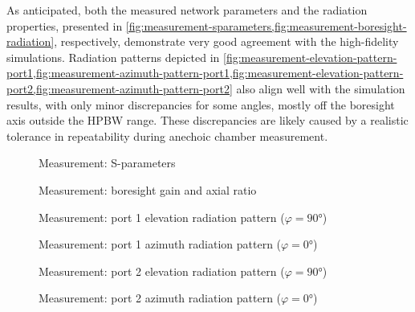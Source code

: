 \documentclass[14pt,a4paper]{ntust_report}
\begin{document}
As anticipated, both the measured network parameters and the radiation properties, presented in \cref{fig:measurement-sparameters,fig:measurement-boresight-radiation}, respectively, demonstrate very good agreement with the high-fidelity simulations. Radiation patterns depicted in \cref{fig:measurement-elevation-pattern-port1,fig:measurement-azimuth-pattern-port1,fig:measurement-elevation-pattern-port2,fig:measurement-azimuth-pattern-port2} also align well with the simulation results, with only minor discrepancies for some angles, mostly off the boresight axis outside the HPBW range. These discrepancies are likely caused by a realistic tolerance in repeatability during anechoic chamber measurement.

\begin{figure}[!ht]
    \centering
    
    \caption{\label{fig:measurement-sparameters}Measurement: S-parameters}
\end{figure}

\begin{figure}[!ht]
    \centering
    
    \caption{\label{fig:measurement-boresight-radiation}Measurement: boresight gain and axial ratio}
\end{figure}

\begin{figure}[!ht]
    \centering
    
    \caption{\label{fig:measurement-elevation-pattern-port1}Measurement: port 1 elevation radiation pattern ($\varphi=\ang{90}$)}
\end{figure}

\begin{figure}[!ht]
    \centering
    
    \caption{\label{fig:measurement-azimuth-pattern-port1}Measurement: port 1 azimuth radiation pattern ($\varphi=\ang{0}$)}
\end{figure}

\begin{figure}[!ht]
    \centering
    
    \caption{\label{fig:measurement-elevation-pattern-port2}Measurement: port 2 elevation radiation pattern ($\varphi=\ang{90}$)}
\end{figure}

\begin{figure}[!ht]
    \centering
    
    \caption{\label{fig:measurement-azimuth-pattern-port2}Measurement: port 2 azimuth radiation pattern ($\varphi=\ang{0}$)}
\end{figure}
\end{document}
